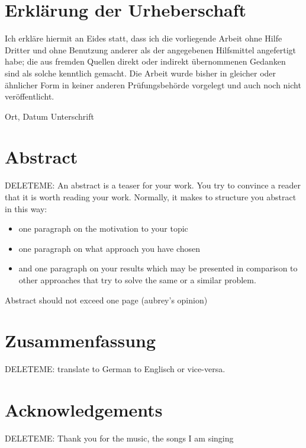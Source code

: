 \chapter*{Erkl{\"a}rung der Urheberschaft}
Ich erkläre hiermit an Eides statt, dass ich die vorliegende Arbeit ohne Hilfe Dritter und ohne Benutzung anderer als der angegebenen Hilfsmittel angefertigt habe; die aus fremden Quellen direkt oder indirekt übernommenen Gedanken sind als solche kenntlich gemacht. Die Arbeit wurde bisher in gleicher oder ähnlicher Form in keiner anderen Prüfungsbehörde vorgelegt und auch noch nicht veröffentlicht.


\vspace{4cm}

Ort, Datum \hfill Unterschrift

\newpage
\chapter*{Abstract}
DELETEME: An abstract is a teaser for your work. You try to convince a reader that it is worth reading your work. Normally, it makes to structure you abstract in this way: 
\begin{itemize}
\item one paragraph on the motivation to your topic
\item one paragraph on what approach you have chosen
\item and one paragraph on your results which may be presented in comparison to other approaches that try to solve the same or a similar problem.
\end{itemize}
Abstract should not exceed one page (aubrey's opinion)

\newpage
\chapter*{Zusammenfassung}
DELETEME: translate to German to Englisch or vice-versa.

\newpage
\chapter*{Acknowledgements}
DELETEME: Thank you for the music, the songs I am singing
